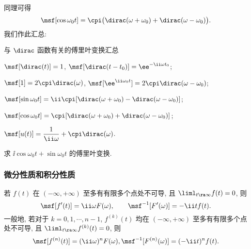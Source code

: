 同理可得
\[
  \msf[\cos{\omega_0 t}]
  =\cpi\bigl(\dirac(\omega+\omega_0)+\dirac(\omega-\omega_0)\bigr).
\]
我们作此汇总:
\begin{fifth}{与 $\dirac$ 函数有关的傅里叶变换汇总}
  \label{page:dirac-fourier-transform}
  \begin{enuma}
    \item $\msf[\dirac(t)]=1$, $\msf[\dirac(t-t_0)]=\ee^{-\ii \omega t_0}$;
    \item $\msf[1]=2\cpi\dirac(\omega)$, $\msf[\ee^{\ii \omega_0 t}]=2\cpi\dirac(\omega-\omega_0)$;
    \item $\msf[\sin \omega_0t]=\ii \cpi[\dirac(\omega+\omega_0)-\dirac(\omega-\omega_0)]$;
    \item $\msf[\cos{\omega_0 t}]=\cpi[\dirac(\omega+\omega_0)+\dirac(\omega-\omega_0)]$;
    \item $\msf[u(t)]=\dfrac1{\ii \omega}+\cpi\dirac(\omega)$.
  \end{enuma}
\end{fifth}







\begin{exercise}
  求 $\ii\cos{\omega_0 t}+\sin{\omega_0 t}$ 的傅里叶变换.
\end{exercise}


\subsubsection{微分性质和积分性质}

\begin{theorem}[微分性质]
  \label{thm:fourier-differential-property}
  若 $f(t)$ 在 $(-\infty,+\infty)$ 至多有有限多个点处不可导, 且 $\liml_{t\ra\infty}f(t)=0$, 则
  \[
    \msf[f'(t)]=\ii \omega F(\omega),\qquad
    \msf^{-1}[F'(\omega)]=-\ii tf(t).
  \]
  一般地, 若对于 $k=0,1,\cdots,n-1$, $f^{(k)}(t)$ 均在 $(-\infty,+\infty)$ 至多有有限多个点处不可导, 且 $\liml_{t\ra\infty}f^{(k)}(t)=0$, 则
  \[
    \msf[f^{(n)}(t)]=(\ii \omega)^n F(\omega),
    \msf^{-1}[F^{(n)}(\omega)]=(-\ii t)^nf(t).
  \]
\end{theorem}

